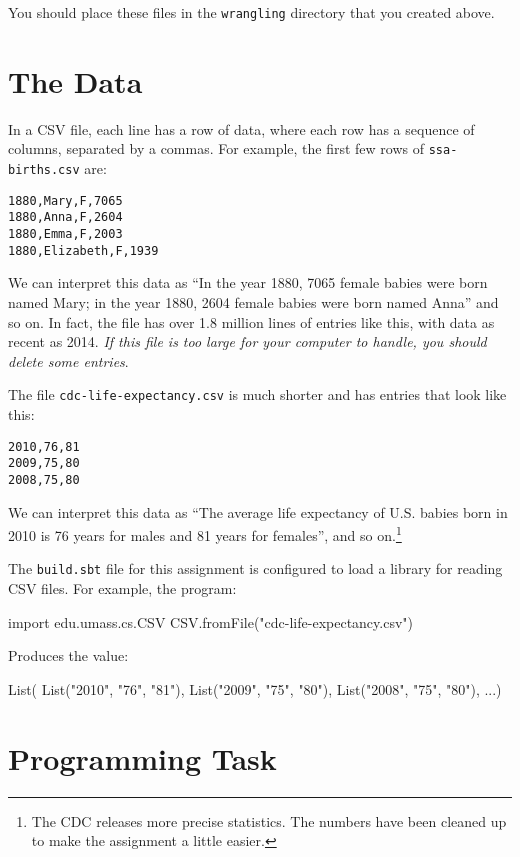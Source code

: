 You should place these files in the \texttt{wrangling} directory that you created above.

\section{The Data}

In a CSV file, each line has a row of data, where each row
has a sequence of columns, separated by a commas. For example, the
first few rows of \texttt{ssa-births.csv} are:

\begin{verbatim}
1880,Mary,F,7065
1880,Anna,F,2604
1880,Emma,F,2003
1880,Elizabeth,F,1939
\end{verbatim}

We can interpret this data as ``In the year 1880, 7065 female babies were born
named Mary; in the year 1880, 2604 female babies were born named Anna'' and so on.
In fact, the file has over 1.8 million lines of entries like this, with data
as recent as 2014. \emph{If this file is too large for your computer to handle,
you should delete some entries}.

The file \texttt{cdc-life-expectancy.csv} is much shorter and has entries
that look like this:

\begin{verbatim}
2010,76,81
2009,75,80
2008,75,80
\end{verbatim}

We can interpret this data as ``The average life expectancy of U.S. babies born
in 2010 is 76 years for males and 81 years for females'', and so
on.\footnote{The CDC releases more precise statistics. The numbers have been
cleaned up to make the assignment a little easier.}

The \texttt{build.sbt} file for this assignment is
configured to load a library for reading CSV files. For example, the program:
\begin{scalacode}
import edu.umass.cs.CSV
CSV.fromFile("cdc-life-expectancy.csv")
\end{scalacode}
Produces the value:
\begin{scalacode}
List(
  List("2010", "76", "81"),
  List("2009", "75", "80"),
  List("2008", "75", "80"),
  ...)
\end{scalacode}

\section{Programming Task}


